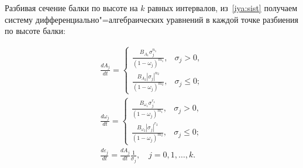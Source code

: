 \smallskip




 Разбивая сечение балки по высоте на $k$ равных интервалов, из~\eqref{iya:sist} получаем систему дифференциально"=алгебраических уравнений в каждой точке разбиения по высоте балки:

 \begin{equation}\label{iya:eq6}

   \begin{array}{l}

\displaystyle 

\frac{dA_{j}}{dt}=

    \begin{cases}

    \displaystyle 

	\frac{B_{A_{1}}\sigma_{j}^{n_1}}{ (1-\omega_{j})^{m_1}}, & \sigma_{j}>0, 

    \\[2mm]

    \displaystyle 

	\frac{B_{A_{2}}|\sigma_{j}|^{n_2}}{ (1-\omega_{j})^{m_2}},& \sigma_{j}\leq 0;

	\end{cases}

   \\[4mm]

\displaystyle 

	\frac{d\omega_{j}}{dt}=

    \begin{cases}

\displaystyle 

	\frac{B_{\omega_{1}}\sigma_{j}^{r_1}}{(1-\omega_{j})^{m_1}}, & \sigma_{j}>0, 

    \\[2mm]

\displaystyle 

	\frac{B_{\omega_{2}}|\sigma_{j}|^{r_2}}{(1-\omega_{j})^{m_2}},& \sigma_{j}\leq 0;

	\end{cases}

    \\

\displaystyle 

	\frac{d\varepsilon_{j}}{dt}=\frac{dA_{j}}{dt}\frac{1}{\sigma_{j}}, \quad  j=0,1,\dots,k.

     \end{array}

  \end{equation}

